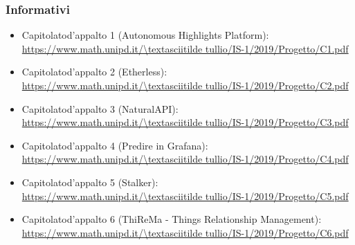 \subsubsection{Informativi}
\begin{itemize}
    \item Capitolato\glo d'appalto 1 (Autonomous Highlights Platform):\\ 
    \url{https://www.math.unipd.it/\textasciitilde tullio/IS-1/2019/Progetto/C1.pdf}
    \item Capitolato\glo d'appalto 2 (Etherless):\\ 
	\url{https://www.math.unipd.it/\textasciitilde tullio/IS-1/2019/Progetto/C2.pdf}
    \item Capitolato\glo d'appalto 3 (NaturalAPI):\\ 
    \url{https://www.math.unipd.it/\textasciitilde tullio/IS-1/2019/Progetto/C3.pdf}
    \item Capitolato\glo d'appalto 4 (Predire in Grafana):\\ 
    \url{https://www.math.unipd.it/\textasciitilde tullio/IS-1/2019/Progetto/C4.pdf}
    \item Capitolato\glo d'appalto 5 (Stalker):\\ 
    \url{https://www.math.unipd.it/\textasciitilde tullio/IS-1/2019/Progetto/C5.pdf}
    \item Capitolato\glo d'appalto 6 (ThiReMa - Things Relationship Management):\\ 
    \url{https://www.math.unipd.it/\textasciitilde tullio/IS-1/2019/Progetto/C6.pdf}
\end{itemize}

	
	
	